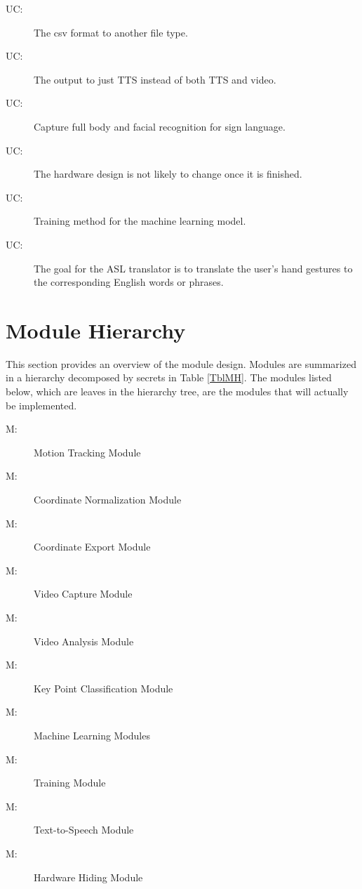 \documentclass[12pt, titlepage]{article}
\newcounter{ucnum}
\newcommand{\uctheucnum}{UC\theucnum}
\newcounter{mnum}
\newcommand{\mthemnum}{M\themnum}
\begin{document}
\begin{description}
\item[ \uctheucnum \label{uc1}:] The csv format to another file type.
\item[ \uctheucnum \label{uc2}:] The output to just TTS instead of both TTS and video.
\item[ \uctheucnum \label{uc3}:] Capture full body and facial recognition for sign language.
\item[ \uctheucnum \label{uc4}:] The hardware design is not likely to change once it is finished.
\item[ \uctheucnum \label{uc5}:] Training method for the machine learning model.
\item[ \uctheucnum \label{uc6}:] The goal for the ASL translator is to translate the user’s hand gestures to the corresponding English words or phrases.
\end{description}

\section{Module Hierarchy} \label{SecMH}

This section provides an overview of the module design. Modules are summarized
in a hierarchy decomposed by secrets in Table \ref{TblMH}. The modules listed
below, which are leaves in the hierarchy tree, are the modules that will
actually be implemented.

\begin{description}
\item [ \mthemnum \label{m1}:] Motion Tracking Module
\item [ \mthemnum \label{m2}:] Coordinate Normalization Module
\item [ \mthemnum \label{m3}:] Coordinate Export Module
\item [ \mthemnum \label{m4}:] Video Capture Module
\item [ \mthemnum \label{m5}:] Video Analysis Module
\item [ \mthemnum \label{m6}:] Key Point Classification Module
\item [ \mthemnum \label{m7}:] Machine Learning Modules
\item [ \mthemnum \label{m8}:] Training Module
\item [ \mthemnum \label{m9}:] Text-to-Speech Module
\item [ \mthemnum \label{m10}:] Hardware Hiding Module


\end{description}
\end{document}
